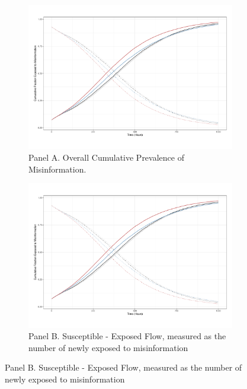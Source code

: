 \documentclass[man, 12pt, a4paper, nolmodern, noextraspace]{apa6}
\begin{document}
\begin{figure}
    \centering
    
    \begin{subfigure}[t]{0.8\textwidth}
        \centering
        \includegraphics[clip, width=\linewidth, page = 1]{draft/Figure_2__Prevalence.pdf} 
        \captionsetup{font=small}
        \caption*{Panel A. Overall Cumulative Prevalence of Misinformation.}
    \end{subfigure}
  
    \begin{subfigure}[t]{0.8\textwidth}
        \centering
        \includegraphics[clip, width=\linewidth, page = 2]{draft/Figure_2__Prevalence.pdf} 
        \captionsetup{font=small}
        \caption*{Panel B. Susceptible - Exposed Flow, measured as the number of newly exposed to misinformation}
    \end{subfigure}
    

\end{figure}
\end{document}
